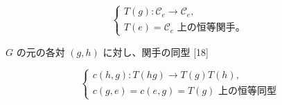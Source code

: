 \begingroup
\makeatletter
\tagsleft@true
\let\veqno\@@leqno
\makeatother
\begin{equation}
  \begin{cases}
    T(g)\colon\mathcal C_e\longrightarrow\mathcal C_e,\\[0.4em]
    T(e)=\text{$\mathcal C_e$ 上の恒等関手。}
  \end{cases}
  \tag{1.2.1.1}
\end{equation}
\endgroup

$G$ の元の各対 $(g,h)$ に対し、関手の同型 [18]

\begingroup
\makeatletter
\tagsleft@true
\let\veqno\@@leqno
\makeatother
\begin{equation}
  \begin{cases}
    c(h,g)\colon T(hg)\longrightarrow T(g)T(h),\\[0.4em]
    c(g,e)=c(e,g)=\text{$T(g)$ 上の恒等同型}
  \end{cases}
  \tag{1.2.1.2}
\end{equation}
\endgroup
